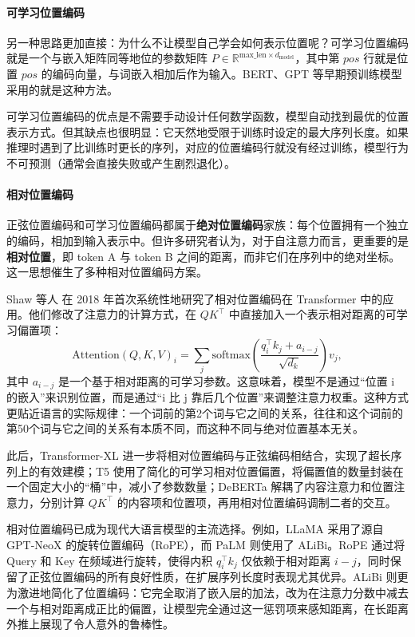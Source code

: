 \paragraph{可学习位置编码} 另一种思路更加直接：为什么不让模型自己学会如何表示位置呢？可学习位置编码就是一个与嵌入矩阵同等地位的参数矩阵 $P \in \mathbb{R}^{\text{max\_len} \times d_{\text{model}}}$，其中第 $pos$ 行就是位置 $pos$ 的编码向量，与词嵌入相加后作为输入。BERT\cite{devlin2019bertpretrainingdeepbidirectional}、GPT\cite{2018Improving} 等早期预训练模型采用的就是这种方法。

可学习位置编码的优点是不需要手动设计任何数学函数，模型自动找到最优的位置表示方式。但其缺点也很明显：它天然地受限于训练时设定的最大序列长度。如果推理时遇到了比训练时更长的序列，对应的位置编码行就没有经过训练，模型行为不可预测（通常会直接失败或产生剧烈退化）。

\paragraph{相对位置编码} 正弦位置编码和可学习位置编码都属于\textbf{绝对位置编码}家族：每个位置拥有一个独立的编码，相加到输入表示中。但许多研究者认为，对于自注意力而言，更重要的是\textbf{相对位置}，即 token A 与 token B 之间的距离，而非它们在序列中的绝对坐标。这一思想催生了多种相对位置编码方案。

Shaw 等人\cite{shaw2018selfattentionrelativepositionrepresentations} 在 2018 年首次系统性地研究了相对位置编码在 Transformer 中的应用。他们修改了注意力的计算方式，在 $QK^\top$ 中直接加入一个表示相对距离的可学习偏置项：
\[
\text{Attention}(Q, K, V)_i = \sum_{j} \text{softmax}\left(\frac{q_i^\top k_j + a_{i-j}}{\sqrt{d_k}}\right) v_j,
\]
其中 $a_{i-j}$ 是一个基于相对距离的可学习参数。这意味着，模型不是通过“位置 i 的嵌入”来识别位置，而是通过“i 比 j 靠后几个位置”来调整注意力权重。这种方式更贴近语言的实际规律：一个词前的第2个词与它之间的关系，往往和这个词前的第50个词与它之间的关系有本质不同，而这种不同与绝对位置基本无关。

此后，Transformer-XL\cite{dai2019transformerxlattentivelanguagemodels} 进一步将相对位置编码与正弦编码相结合，实现了超长序列上的有效建模；T5\cite{raffel2023exploringlimitstransferlearning} 使用了简化的可学习相对位置偏置，将偏置值的数量封装在一个固定大小的“桶”中，减小了参数数量；DeBERTa\cite{he2021debertadecodingenhancedbertdisentangled} 解耦了内容注意力和位置注意力，分别计算 $QK^\top$ 的内容项和位置项，再用相对位置编码调制二者的交互。

相对位置编码已成为现代大语言模型的主流选择。例如，LLaMA\cite{touvron2023llamaopenefficientfoundation} 采用了源自 GPT-NeoX\cite{black2022gptneox20bopensourceautoregressivelanguage} 的旋转位置编码（RoPE）\cite{su2023roformerenhancedtransformerrotary}，而 PaLM\cite{chowdhery2022palmscalinglanguagemodeling} 则使用了 ALiBi\cite{press2022trainshorttestlong}。RoPE 通过将 Query 和 Key 在频域进行旋转，使得内积 $q_i^\top k_j$ 仅依赖于相对距离 $i-j$，同时保留了正弦位置编码的所有良好性质，在扩展序列长度时表现尤其优异。ALiBi 则更为激进地简化了位置编码：它完全取消了嵌入层的加法，改为在注意力分数中减去一个与相对距离成正比的偏置，让模型完全通过这一惩罚项来感知距离，在长距离外推上展现了令人意外的鲁棒性。

